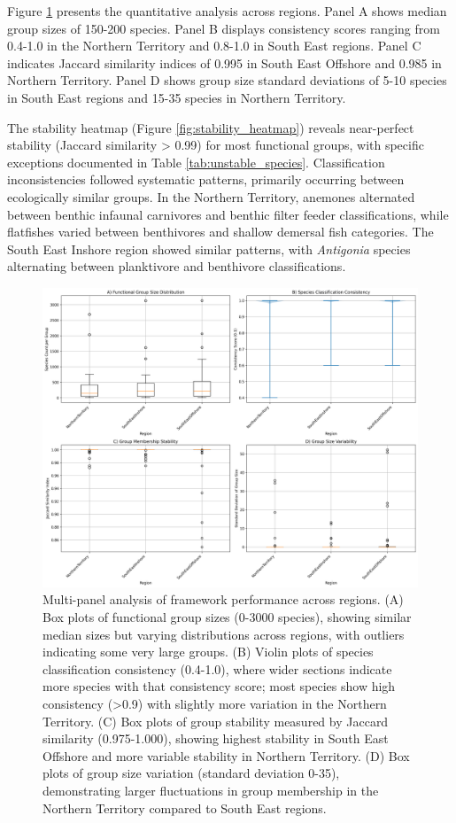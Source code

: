 Figure \ref{fig:regional_analysis} presents the quantitative analysis across regions. Panel A shows median group sizes of 150-200 species. Panel B displays consistency scores ranging from 0.4-1.0 in the Northern Territory and 0.8-1.0 in South East regions. Panel C indicates Jaccard similarity indices of 0.995 in South East Offshore and 0.985 in Northern Territory. Panel D shows group size standard deviations of 5-10 species in South East regions and 15-35 species in Northern Territory.

The stability heatmap (Figure \ref{fig:stability_heatmap}) reveals near-perfect stability (Jaccard similarity > 0.99) for most functional groups, with specific exceptions documented in Table \ref{tab:unstable_species}. Classification inconsistencies followed systematic patterns, primarily occurring between ecologically similar groups. In the Northern Territory, anemones alternated between benthic infaunal carnivores and benthic filter feeder classifications, while flatfishes varied between benthivores and shallow demersal fish categories. The South East Inshore region showed similar patterns, with \textit{Antigonia} species alternating between planktivore and benthivore classifications.

\begin{figure}[htbp]
    \centering
    \includegraphics[width=\textwidth]{figures/regional_group_analysis.png}
    \caption{Multi-panel analysis of framework performance across regions. (A) Box plots of functional group sizes (0-3000 species), showing similar median sizes but varying distributions across regions, with outliers indicating some very large groups. (B) Violin plots of species classification consistency (0.4-1.0), where wider sections indicate more species with that consistency score; most species show high consistency (>0.9) with slightly more variation in the Northern Territory. (C) Box plots of group stability measured by Jaccard similarity (0.975-1.000), showing highest stability in South East Offshore and more variable stability in Northern Territory. (D) Box plots of group size variation (standard deviation 0-35), demonstrating larger fluctuations in group membership in the Northern Territory compared to South East regions.}
    \label{fig:regional_analysis}
\end{figure}

